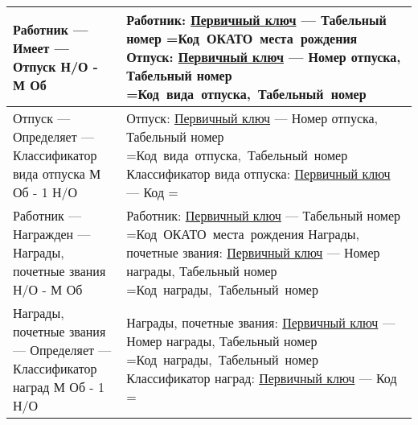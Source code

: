 \documentclass[10pt, a4paper, titlepage]{article}
\newcommand{\firstColumn}[4]{#1 --- \newline #2 --- \newline #3 \newline\newline #4}
\newcommand{\thirdColumn}[6]{
#1 \newline 
\underline{Первичный ключ} --- #2 \newline 
\setbox0=\hbox{#3\unskip}\ifdim\wd0=0pt
\else
  \underline{Внешний(е) ключ(-и)}: #3 \newline
\fi
#4 \newline 
\underline{Первичный ключ} --- #5 \newline
\setbox0=\hbox{#6\unskip}\ifdim\wd0=0pt
\else
  \underline{Внешний(е) ключ(-и)}: #6 \newline
\fi
}
\newcommand\generalizedColumn[6]{\thirdColumn{#1:}{#2}{#3}{#4:}{#5}{#6}}
\newcommand\ruleOneOptionalManyMondatory{1 Н/О - М Об}
\newcommand\ruleManyMondatoryOneOptional{М Об - 1 Н/О}
\newcommand\rabotnikPK{Табельный номер}
\newcommand\rabotnikFK{Код ОКАТО места рождения}
\newcommand\nagradiPochetnieZvaniyaPK{Номер награды, Табельный номер}
\newcommand\nagradiPochetnieZvaniyaFK{Код награды, Табельный номер}
\newcommand\otpuskPK{Номер отпуска, Табельный номер}
\newcommand{\otpuskFK}{Код вида отпуска, Табельный номер}
\newcommand\kVidaOtpuskaPK{Код}
\newcommand\kVidaOtpuskaFK{}
\newcommand\kNagradPK{Код}
\newcommand\kNagradFK{}
\begin{document}
\begin{center}
\begin{longtable}{ | m{} | m{} | }
 \hline
 \firstColumn{Работник}{Имеет}{Отпуск}{\ruleOneOptionalManyMondatory} & \generalizedColumn{Работник}{\rabotnikPK}{\rabotnikFK}{Отпуск}{\otpuskPK}{\otpuskFK} \\ 
 
 \hline
 \firstColumn{Отпуск}{Определяет}{Классификатор вида отпуска}{\ruleManyMondatoryOneOptional} & \generalizedColumn{Отпуск}{\otpuskPK}{\otpuskFK}{Классификатор вида отпуска}{\kVidaOtpuskaPK}{\kVidaOtpuskaFK} \\ 
 
 \hline
 \firstColumn{Работник}{Награжден}{Награды, почетные звания}{\ruleOneOptionalManyMondatory} & \generalizedColumn{Работник}{\rabotnikPK}{\rabotnikFK}{Награды, почетные звания}{\nagradiPochetnieZvaniyaPK}{\nagradiPochetnieZvaniyaFK} \\ 
 
 \hline
 \firstColumn{Награды, почетные звания}{Определяет}{Классификатор наград}{\ruleManyMondatoryOneOptional} & \generalizedColumn{Награды, почетные звания}{\nagradiPochetnieZvaniyaPK}{\nagradiPochetnieZvaniyaFK}{Классификатор наград}{\kNagradPK}{\kNagradFK} \\ 
 
 
 \hline
\end{longtable}
\end{center}
\end{document}
